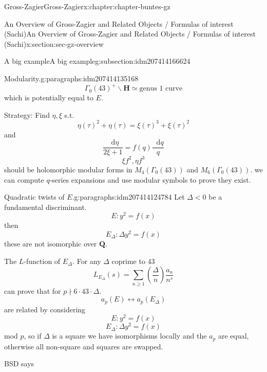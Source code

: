 \documentclass[oneside,10pt,]{book}
\numberwithin{equation}{section}
\newcommand{\diff}{\mathop{}\!\mathrm{d}}
\newcommand{\legendre}[2]{\left(\frac{#1}{#2}\right)}
\newcommand{\QQ}{\mathbf{Q}}
\newcommand{\HH}{\mathbf{H}}
\newcommand{\lt}{<}
\begin{document}
\begin{chapterptx}{Gross-Zagier}{}{Gross-Zagier}{}{}{x:chapter:chapter-buntes-gz}
\begin{sectionptx}{An Overview of Gross-Zagier and Related Objects \slash{} Formulas of interest (Sachi)}{}{An Overview of Gross-Zagier and Related Objects \slash{} Formulas of interest (Sachi)}{}{}{x:section:sec-gz-overview}
\begin{subsectionptx}{A big example}{}{A big example}{}{}{g:subsection:idm207414166624}
\begin{paragraphs}{Modularity.}{g:paragraphs:idm207414135168}
\begin{equation*}
\end{equation*}
%
\begin{equation*}
\Gamma _0(43)^+ \backslash \HH \simeq \text{genus 1 curve}
\end{equation*}
which is potentially equal to \(E\).%
\par
Strategy: Find \(\eta ,\xi \) s.t.%
\begin{equation*}
\eta(\tau )^2 + \eta(\tau ) = \xi (\tau )^3 + \xi (\tau )^2
\end{equation*}
and%
\begin{equation*}
\frac{\diff \eta}{2\xi  + 1} = f(q) \frac{\diff q}{q}
\end{equation*}
%
\begin{equation*}
\xi f^2, \eta f^3
\end{equation*}
should be holomorphic modular forms in \(M_4(\Gamma _0(43))\) and \(M_6(\Gamma _0(43))\). we can compute \(q\)-series expansions and use modular symbols to prove they exist.%
\end{paragraphs}%
\begin{paragraphs}{Quadratic twists of \(E\).}{g:paragraphs:idm207414124784}%
Let \(\Delta \lt  0\) be a fundamental discriminant.%
\begin{equation*}
E\colon y^2 = f(x)
\end{equation*}
then%
\begin{equation*}
E_{\Delta }\colon \Delta y^2 = f(x)
\end{equation*}
these are not isomorphic over \(\QQ\).%
\par
The \(L\)-function of \(E_\Delta \). For any \(\Delta \) coprime to 43%
\begin{equation*}
L_{E_\Delta } (s) = \sum_{n\ge 1} \legendre \Delta  n \frac{a_n}{n^s}
\end{equation*}
can prove that for \(p\nmid 6\cdot 43 \cdot \Delta \).%
\begin{equation*}
a_p(E) \leftrightarrow a_p(E_\Delta )
\end{equation*}
are related by considering%
\begin{equation*}
E\colon  y^2 = f(x)
\end{equation*}
%
\begin{equation*}
E_\Delta \colon  \Delta y^2= f(x)
\end{equation*}
mod \(p\), so if \(\Delta \) is a square we have isomorphisms locally and the \(a_p\) are equal, otherwise all non-square and squares are swapped.%
\par
BSD says%
\begin{equation*}

\end{equation*}
\end{paragraphs}
\end{subsectionptx}
\end{sectionptx}
\end{chapterptx}
\end{document}

